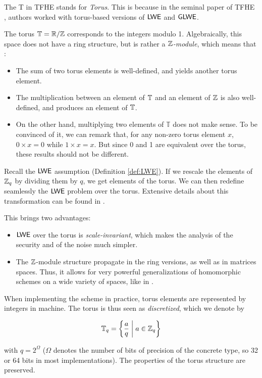 The T in TFHE stands for \textit{Torus}. This is because in the seminal paper of TFHE \cite{JC:CGGI20}, authors worked with torus-based versions of $\textsf{LWE}$ and $\textsf{GLWE}$.


The torus $\mathbb{T} = \mathbb{R} / \mathbb{Z}$ corresponds to the integers modulo 1. Algebraically, this space does not have a ring structure, but is rather a \textit{$\mathbb{Z}$-module}, which means that :

\begin{itemize}
	\item The sum of two torus elements is well-defined, and yields another torus element.
	\item The multiplication between an element of $\mathbb{T}$ and an element of $\mathbb{Z}$ is also well-defined, and produces an element of $\mathbb{T}$.
	\item On the other hand, multiplying two elements of $\mathbb T$ does not make sense. To be convinced of it, we can remark that, for any non-zero torus element $x$, $0 \times x = 0$ while $1 \times x = x$. But since 0 and 1 are equivalent over the torus, these results should not be different. 
\end{itemize}



Recall the $\textsf{LWE}$ assumption (Definition \ref{def:LWE}). If we rescale the elements of $\mathbb{Z}_q$ by dividing them by $q$, we get elements of the torus. We can then redefine seamlessly the $\textsf{LWE}$ problem over the torus. Extensive details about this transformation can be found in \cite{these_chillotti}.


This brings two advantages:

\begin{itemize}
	\item $\textsf{LWE}$ over the torus is \textit{scale-invariant}, which makes the analysis of the security and of the noise much simpler.
	\item The $\mathbb{Z}$-module structure propagate in the ring versions, as well as in matrices spaces. Thus, it allows for very powerful generalizations of homomorphic schemes on a wide variety of spaces, like in \cite{chimera, chimera2}.
\end{itemize} 


When implementing the scheme in practice, torus elements are represented by integers in machine. The torus is thus seen as \textit{discretized}, which we denote by 

\[ \mathbb{T}_q = \left \{   \frac a q \;\middle|\; a \in \mathbb{Z}_q  \right \} \] 

with $q = 2^\Omega$ ($\Omega$ denotes the number of bits of precision of the concrete type, so 32 or 64 bits in most implementations). The properties of the torus structure are preserved.


